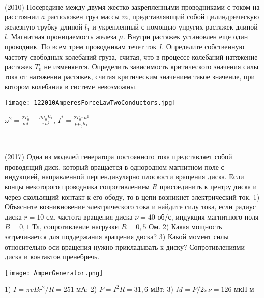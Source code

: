 \begin{ex}
\hspace{0pt} \\
\begin{minipage}{.65\textwidth}
(2010) Посередине между двумя жестко закрепленными проводниками с током на расстоянии $a$ расположен груз массы $m$, представляющий собой цилиндрическую железную трубку длиной $l_1$ и укрепленный с помощью упругих растяжек длиной $l$. 
Магнитная проницаемость железа $\mu$. Внутри растяжек установлен еще один проводник. По всем трем проводникам течет ток $I$. 
Определите собственную частоту свободных колебаний груза, считая, что в процессе колебаний натяжение растяжек $T_0$ не изменяется. 
Определить зависимость критического значения силы тока от натяжения растяжек, считая критическим значением такое значение, при котором колебания в системе невозможны.
\end{minipage}
\begin{minipage}{.35\textwidth}
\centering
\texttt{[image: 122010AmperesForceLawTwoConductors.jpg]}
\end{minipage}
\begin{ans}
$\omega^2 = \frac{2 T_0}{ml} - \frac{\mu \mu_0 I l_1}{\pi a^2}$, $I^* = \frac{2T_0 \pi a^2}{\mu \mu_0 l l_1}$
\end{ans}
\end{ex}

\begin{ex}
\hspace{0pt} \\
\begin{minipage}{.65\textwidth}
(2017) Одна из моделей генератора постоянного тока представляет собой проводящий диск, который вращается в однородном магнитном поле с индукцией,
направленной перпендикулярно плоскости вращения диска. Если концы некоторого проводника сопротивлением $R$ присоединить к центру диска и через скользящий контакт к его ободу, то в цепи возникнет электрический ток. 1) Объясните возникновение электрического тока и найдите силу тока, если радиус диска $r = 10$ см, частота вращения диска $\nu = 40$ об/с, индукция магнитного поля $B = 0,1$ Тл, сопротивление нагрузки $R = 0,5$ Ом. 2) Какая мощность затрачивается для поддержания вращения диска? 3) Какой момент силы относительно оси вращения нужно прикладывать к диску? Сопротивлениями диска и контактов пренебречь.
\end{minipage}
\begin{minipage}{.35\textwidth}
\centering
\texttt{[image: AmperGenerator.png]}
\end{minipage}
\begin{ans}
1) $I=\pi v B r^2/R = 251$ мА; 2) $P = I^2 R = 31,6$ мВт; 3) $M = P/2 \pi \nu = 126$ мкН м
\end{ans}
\end{ex}

